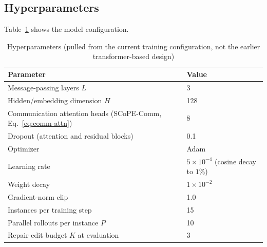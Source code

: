 \subsection{Hyperparameters}

Table~\ref{tab:hyperparameters} shows the model configuration.

\begin{table}[htbp]
\centering
\small
\caption{Hyperparameters (pulled from the current training configuration, not the earlier transformer-based design)}
\label{tab:hyperparameters}
\begin{tabular}{ll}
\hline
\textbf{Parameter} & \textbf{Value} \\ \hline
Message-passing layers $L$ & 3 \\
Hidden/embedding dimension $H$ & 128 \\
Communication attention heads (SCoPE-Comm, Eq.~\eqref{eq:comm-attn}) & 8 \\
Dropout (attention and residual blocks) & 0.1 \\
Optimizer & Adam \\
Learning rate & $5 \times 10^{-4}$ (cosine decay to $1\%$) \\
Weight decay & $1 \times 10^{-2}$ \\
Gradient-norm clip & 1.0 \\
Instances per training step & 15 \\
Parallel rollouts per instance $P$ & 10 \\
Repair edit budget $K$ at evaluation & 3 \\ \hline
\end{tabular}
\end{table}



